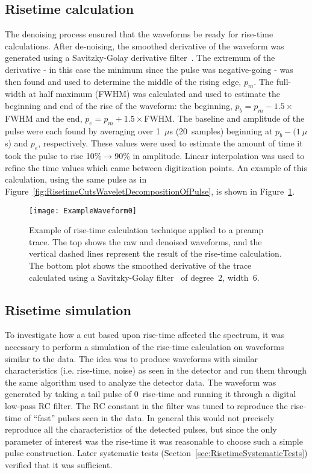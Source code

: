 		\subsection{Risetime calculation}
		\label{sec:RisetimeCalculation}
	The denoising process ensured that the waveforms be ready for rise-time calculations.  After de-noising, the smoothed derivative of the waveform was generated using a Savitzky-Golay derivative filter~\cite{Sav64aa}.  The extremum of the derivative - in this case the minimum since the pulse was negative-going - was then found and used to determine the middle of the rising edge, $p_{m}$.  The full-width at half maximum (FWHM) was calculated and used to estimate the beginning and end of the rise of the waveform: the beginning, $p_{b} = p_{m} - 1.5\times$FWHM and the end, $p_{e} = p_{m} + 1.5\times$FWHM.  The baseline and amplitude of the pulse were each found by averaging over 1~$\mu$s (20~samples) beginning at $p_{b} - (1~\mu$s) and $p_{e}$, respectively.  These values were used to estimate the amount of time it took the pulse to rise 10\%$\to$90\% in amplitude.  Linear interpolation was used to refine the time values which came between digitization points.  An example of this calculation, using the same pulse as in Figure~\ref{fig:RisetimeCutsWaveletDecompositionOfPulse}, is shown in Figure~\ref{fig:RisetimeCutsExampleOfPulse}.  
		
				\begin{figure}
					\centering
					\texttt{[image: ExampleWaveform0]}
					\caption{Example of rise-time calculation technique applied to a preamp trace.  
					The top shows the raw and denoised waveforms, and the vertical dashed lines represent the result of the rise-time
					calculation.  The bottom plot shows the smoothed derivative of the trace calculated using a Savitzky-Golay 
					filter~\cite{Sav64aa} of degree~2, width~6.}
					\label{fig:RisetimeCutsExampleOfPulse}
				\end{figure}					

			\subsection{Risetime simulation}
			\label{sec:RisetimeSimulation}
	
	To investigate how a cut based upon rise-time affected the spectrum, it was necessary to perform a simulation of the rise-time calculation on waveforms similar to the data.  The idea was to produce waveforms with similar characteristics (i.e. rise-time, noise) as seen in the detector and run them through the same algorithm used to analyze the detector data.  The waveform was generated by taking a tail pulse of 0~rise-time and running it through a digital low-pass RC filter.  The RC constant in the filter was tuned to reproduce the rise-time of ``fast'' pulses seen in the data.  In general this would not precisely reproduce all the characteristics of the detected pulses, but since the only parameter of interest was the rise-time it was reasonable to choose such a simple pulse construction.  Later systematic tests (Section~\ref{sec:RisetimeSystematicTests}) verified that it was sufficient.  
	
